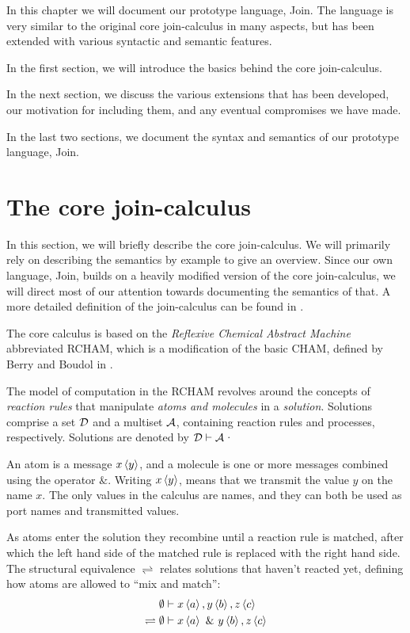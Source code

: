 
In this chapter we will document our prototype language, Join.  The
language is very similar to the original core join-calculus in many
aspects, but has been extended with various syntactic and semantic
features.

In the first section, we will introduce the basics behind the core
join-calculus.

In the next section, we discuss the various extensions that has been
developed, our motivation for including them, and any eventual compromises we
have made.

In the last two sections, we document the syntax and semantics of our prototype
language, Join.

\section{The core join-calculus}

In this section, we will briefly describe the core join-calculus. We will
primarily rely on describing the semantics by example to give an overview.
Since our own language, Join, builds on a heavily modified version of the core
join-calculus, we will direct most of our attention towards documenting the
semantics of that. A more detailed definition of the join-calculus can be found
in \cite{fournet1996reflexive}.

The core calculus is based on the \emph{Reflexive Chemical Abstract Machine}
abbreviated RCHAM, which is a modification of the basic CHAM, defined by Berry
and Boudol in \cite{berry1989chemical}.

The model of computation in the RCHAM revolves around the concepts of
\emph{reaction rules} that manipulate \emph{atoms and molecules} in a
\emph{solution}. Solutions comprise a set $\mathcal{D}$ and a multiset $\mathcal{A}$, containing
reaction rules and processes, respectively. Solutions are denoted by $\mathcal{D} \vdash
\mathcal{A}$·

An atom is a message $\atm x<y>$, and a molecule is one or more
messages combined using the operator $\&$. Writing $\atm x<y>$, means that we
transmit the value $y$ on the name $x$. The only values in the calculus are
names, and they can both be used as port names and transmitted values.

As atoms enter the solution they recombine until a reaction rule is matched,
after which the left hand side of the matched rule is replaced with the right
hand side. The structural equivalence $\rightleftharpoons$ relates solutions
that haven't reacted yet, defining how atoms are allowed to ``mix and match'':
\begin{align*}
                  & \emptyset \vdash \atm x<a>, \atm y<b>, \atm z<c> \\
\rightleftharpoons{}& \emptyset \vdash \atm x<a> ~\& ~\atm y<b>, \atm z<c>
\end{align*}

